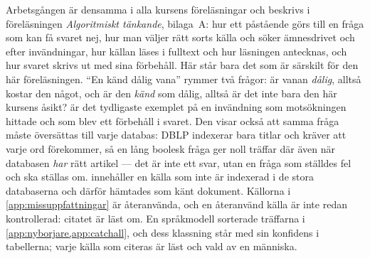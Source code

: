 Arbetsgången är densamma i alla kursens föreläsningar och beskrivs i
föreläsningen \emph{Algoritmiskt tänkande}, bilaga~A: hur ett påstående
görs till en fråga som kan få svaret nej, hur man väljer rätt sorts
källa och söker ämnesdrivet och efter invändningar, hur källan läses i
fulltext och hur läsningen antecknas, och hur svaret skrivs ut med sina
förbehåll.  Här står bara det som är särskilt för den här föreläsningen.
\enquote{En känd dålig vana} rymmer två frågor: är vanan
\emph{dålig}, alltså kostar den något, och är den \emph{känd} som
dålig, alltså är det inte bara den här kursens åsikt?   är det tydligaste exemplet på en
invändning som motsökningen hittade och som blev ett förbehåll i svaret.
Den visar också att samma fråga måste översättas till varje databas:
DBLP indexerar bara titlar och kräver att varje ord förekommer, så en
lång boolesk fråga ger noll träffar där även när databasen \emph{har}
rätt artikel --- det är inte ett svar, utan en fråga som ställdes fel
och ska ställas om.   innehåller en källa som inte
är indexerad i de stora databaserna och därför hämtades som känt
dokument.  Källorna i \cref{app:missuppfattningar} är återanvända, och
en återanvänd källa är inte redan kontrollerad: citatet är läst om.  En
språkmodell sorterade träffarna i \cref{app:nyborjare,app:catchall},
och dess klassning står med sin konfidens i tabellerna; varje källa som
citeras är läst och vald av en människa.

